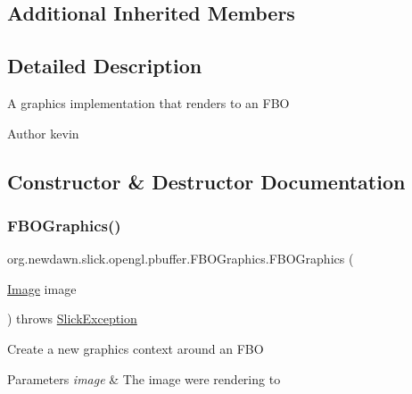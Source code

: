 \subsection*{Additional Inherited Members}


\subsection{Detailed Description}
A graphics implementation that renders to an F\+BO

\begin{DoxyAuthor}{Author}
kevin 
\end{DoxyAuthor}


\subsection{Constructor \& Destructor Documentation}
\mbox{\label{classorg_1_1newdawn_1_1slick_1_1opengl_1_1pbuffer_1_1_f_b_o_graphics_ae5dc91e31ef5b22f6fc4cbe7f2f6ddb1}} 
\subsubsection{\texorpdfstring{F\+B\+O\+Graphics()}{FBOGraphics()}}
{\footnotesize\ttfamily org.\+newdawn.\+slick.\+opengl.\+pbuffer.\+F\+B\+O\+Graphics.\+F\+B\+O\+Graphics (\begin{DoxyParamCaption}\item[{\mbox{\hyperlink{classorg_1_1newdawn_1_1slick_1_1_image}{Image}}}]{image }\end{DoxyParamCaption}) throws \mbox{\hyperlink{classorg_1_1newdawn_1_1slick_1_1_slick_exception}{Slick\+Exception}}\hspace{0.3cm}{\ttfamily [inline]}}

Create a new graphics context around an F\+BO


\begin{DoxyParams}{Parameters}
{\em image} & The image we\textquotesingle{}re rendering to \\
\hline
\end{DoxyParams}

